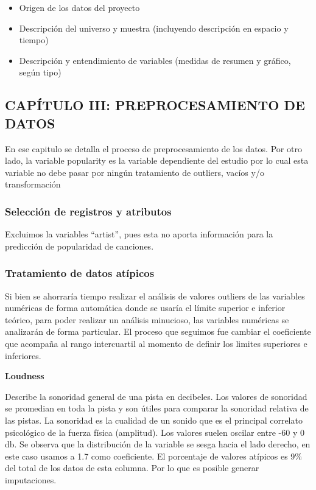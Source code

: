 \documentclass[
  letterpaper,
  DIV=11,
  numbers=noendperiod]{scrartcl}
\providecommand{\tightlist}{%
  \setlength{\itemsep}{0pt}\setlength{\parskip}{0pt}}
\begin{document}
\begin{itemize}
\tightlist
\item
  Origen de los datos del proyecto
\item
  Descripción del universo y muestra (incluyendo descripción en espacio
  y tiempo)
\item
  Descripción y entendimiento de variables (medidas de resumen y
  gráfico, según tipo)
\end{itemize}

\hypertarget{capuxedtulo-iii-preprocesamiento-de-datos}{%
\subsection{CAPÍTULO III: PREPROCESAMIENTO DE
DATOS}\label{capuxedtulo-iii-preprocesamiento-de-datos}}

En ese capitulo se detalla el proceso de preprocesamiento de los datos.
Por otro lado, la variable popularity es la variable dependiente del
estudio por lo cual esta variable no debe pasar por ningún tratamiento
de outliers, vacíos y/o transformación

\hypertarget{selecciuxf3n-de-registros-y-atributos}{%
\subsubsection{Selección de registros y
atributos}\label{selecciuxf3n-de-registros-y-atributos}}

Excluimos la variables ``artist'', pues esta no aporta información para
la predicción de popularidad de canciones.

\hypertarget{tratamiento-de-datos-atuxedpicos}{%
\subsubsection{Tratamiento de datos
atípicos}\label{tratamiento-de-datos-atuxedpicos}}

Si bien se ahorraría tiempo realizar el análisis de valores outliers de
las variables numéricas de forma automática donde se usaría el límite
superior e inferior teórico, para poder realizar un análisis minucioso,
las variables numéricas se analizarán de forma particular. El proceso
que seguimos fue cambiar el coeficiente que acompaña al rango
intercuartil al momento de definir los limites superiores e inferiores.

\textbf{Loudness}

Describe la sonoridad general de una pista en decibeles. Los valores de
sonoridad se promedian en toda la pista y son útiles para comparar la
sonoridad relativa de las pistas. La sonoridad es la cualidad de un
sonido que es el principal correlato psicológico de la fuerza física
(amplitud). Los valores suelen oscilar entre -60 y 0 db. Se observa que
la distribución de la variable se sesga hacia el lado derecho, en este
caso usamos a 1.7 como coeficiente. El porcentaje de valores atípicos es
9\% del total de los datos de esta columna. Por lo que es posible
generar imputaciones.
\end{document}
